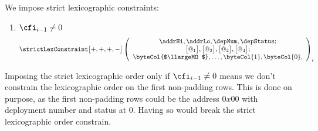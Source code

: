 We impose strict lexicographic constraints:
\begin{enumerate}
	\item \If $\cfi_{i-1} \neq 0$ \Then
	\[
		\strictLexConstraint\big[ +, +, +, - \big]
		\left(
		\begin{array}{c}
			\addrHi, \addrLo, \depNum, \depStatus; \\
			\big[@_{1}\big], \big[@_{2}\big], \big[@_{2}\big], \big[@_{4}\big]; \\
			\byteCol{$\llargeMO$}, \dots, \byteCol{1}, \byteCol{0}, \\
		\end{array}
		\right)_{i}
	\]
\end{enumerate}

\saNote{} Imposing the strict lexicographic order only if $\cfi_{i-1} \neq 0$ means we don't constrain the lexicographic order on the first non-padding rows. 
This is done on purpose, as the first non-padding rows could be the address $0x00$ with deployment number and status at 0. Having so would break the strict lexicographic order constrain. 